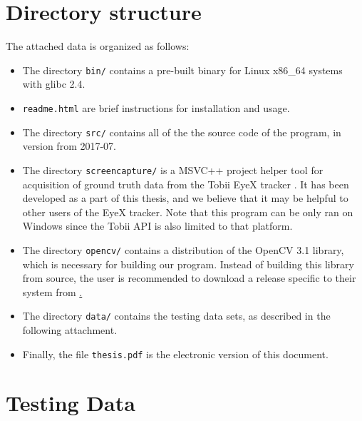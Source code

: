 
\setcounter{section}{0}
\renewcommand{\thesection}{\Alph{section}}

\section{Directory structure}
\label{s:dirstructure}

The attached data is organized as follows:

\begin{itemize}
\item The directory {\tt bin/} contains a pre-built binary for Linux x86\_64 systems with glibc 2.4.

\item {\tt readme.html} are brief instructions for installation and usage.

\item The directory {\tt src/} contains all of the the source code of the program, in version from 2017-07.

\item The directory {\tt screencapture/} is a MSVC++ project helper tool for acquisition of ground truth data from the Tobii EyeX tracker \cite{tobii}.
It has been developed as a part of this thesis, and we believe that it may be helpful to other users of the EyeX tracker.
Note that this program can be only ran on Windows since the Tobii API is also limited to that platform.

\item The directory {\tt opencv/} contains a distribution of the OpenCV 3.1 library, which is necessary for building our program.
Instead of building this library from source, the user is recommended to download a release specific to their system from \href{http://opencv.org}.

\item The directory {\tt data/} contains the testing data sets, as described in the following attachment.

\item Finally, the file {\tt thesis.pdf} is the electronic version of this document.

\end{itemize}

\section{Testing Data}
\label{s:testingdata}

\todo{\dots}
